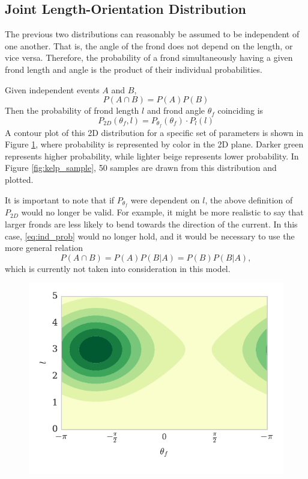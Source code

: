 \documentclass[ms,cpyr,lof,lot]{uathesis}
\begin{document}
\subsection{Joint Length-Orientation Distribution}
\label{sec:dist_2d}
The previous two distributions can reasonably be assumed to be independent of one another. That is, the angle of the frond does not depend on the length, or vice versa.
Therefore, the probability of a frond simultaneously having a given frond length and angle is the product of their individual probabilities.

Given independent events $A$ and $B$,
\begin{equation*}
	\label{eq:ind_prob}
	P(A \cap B) = P(A)P(B)
\end{equation*}
Then the probability of frond length $l$ and frond angle $\theta_f$ coinciding is 
\begin{equation*}
	P_{2D}(\theta_f,l) = P_{\theta_f}(\theta_f) \cdot P_l(l)
\end{equation*}
A contour plot of this 2D distribution for a specific set of parameters is shown in Figure \ref{fig:dist_2d}, where probability is represented by color in the 2D plane.
Darker green represents higher probability, while lighter beige represents lower probability.
In Figure \ref{fig:kelp_sample}, 50 samples are drawn from this distribution and plotted.

It is important to note that if $P_{\theta_f}$ were dependent on $l$, the above definition of $P_{2D}$ would no longer be valid.
For example, it might be more realistic to say that larger fronds are less likely to bend towards the direction of the current.
In this case, \eqref{eq:ind_prob} would no longer hold, and it would be necessary to use the more general relation
\begin{equation*}
	P(A \cap B) = P(A)P(B|A) = P(B)P(B|A),
\end{equation*}
which is currently not taken into consideration in this model.

\begin{figure}[h]
	\centering
	\includegraphics[width=.75\linewidth]{prob_2d}
	\vspace{-3em}
	\label{fig:dist_2d}
\end{figure}
\end{document}
